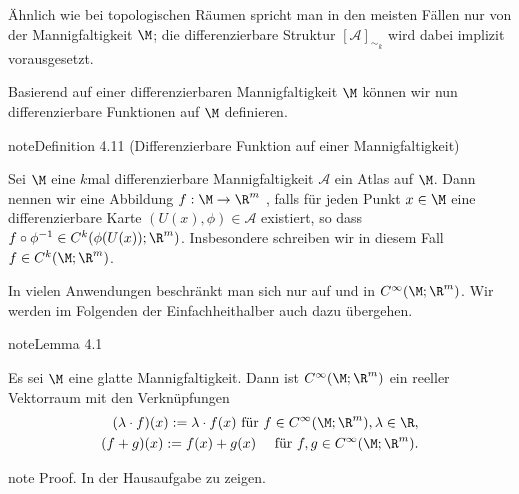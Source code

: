 \documentclass[letterpaper,10pt,german]{jupyterBook}
\begin{document}
\sphinxAtStartPar
Ähnlich wie bei topologischen Räumen spricht man in den meisten Fällen nur von der Mannigfaltigkeit \(\M\); die differenzierbare Struktur \([\mathcal{A}]_{\sim_k}\) wird dabei implizit vorausgesetzt.

\sphinxAtStartPar
Basierend auf einer differenzierbaren Mannigfaltigkeit \(\M\) können wir nun differenzierbare Funktionen auf \(\M\) definieren.
\label{manifolds/manifolds_prelim:definition-14}
\begin{sphinxadmonition}{note}{Definition 4.11 (Differenzierbare Funktion auf einer Mannigfaltigkeit)}



\sphinxAtStartPar
Sei \(\M\) eine \(k\)\sphinxhyphen{}mal differenzierbare Mannigfaltigkeit \(\mathcal{A}\) ein Atlas auf \(\M\).
Dann nennen wir eine Abbildung \(f:\M\to\R^m\) , falls für jeden Punkt \(x\in\M\) eine differenzierbare Karte \((U(x),\phi)\in\mathcal{A}\) existiert, so dass \(f\circ\phi^{-1} \in C^k(\phi(U(x)); \R^m)\).
Insbesondere schreiben wir in diesem Fall \(f\in C^k(\M; \R^m)\).
\end{sphinxadmonition}

\sphinxAtStartPar
In vielen Anwendungen beschränkt man sich nur auf  und  in \(C^\infty(\M; \R^m)\).
Wir werden im Folgenden der Einfachheit\sphinxhyphen{}halber auch dazu übergehen.
\label{manifolds/manifolds_prelim:lemma-15}
\begin{sphinxadmonition}{note}{Lemma 4.1}



\sphinxAtStartPar
Es sei \(\M\) eine glatte Mannigfaltigkeit.
Dann ist \(C^\infty(\M; \R^m)\) ein reeller Vektorraum mit den Verknüpfungen
\begin{equation*}
\begin{split}(\lambda \cdot f)(x) := \lambda\cdot f(x)\text{ für } f\in C^\infty(\M; \R^m), \lambda\in\R,\\
(f + g)(x) := f(x) + g(x)\quad\text{ für } f,g\in C^\infty(\M; \R^m).\end{split}
\end{equation*}\end{sphinxadmonition}

\begin{sphinxadmonition}{note}
\sphinxAtStartPar
Proof. In der Hausaufgabe zu zeigen.
\end{sphinxadmonition}
\end{document}
